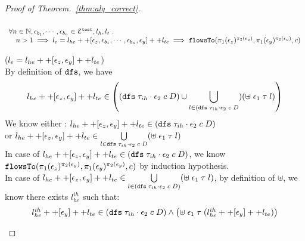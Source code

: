 \begin{proof}[Proof of Theorem.~\ref{thm:alg_correct}]
\begin{case}
\begin{equation}
  \end{equation}
%
%
\begin{equation}
\begin{array}{l}
  \forall n \in \mathbb{N}, \mathtt{\epsilon}_{b_1}, \cdots, \mathtt{\epsilon}_{b_n} \in \mathcal{E}^{\mathtt{{test}}}, l_h, l_t ~.~
   \\ \quad 
   n > 1 \implies
   l_e = l_{he} ++ {[\mathtt{\epsilon}_z, \mathtt{\epsilon}_{b_1}, \cdots, \mathtt{\epsilon}_{b_n}, \mathtt{\epsilon}_y]} ++ l_{te}
  \implies \mathtt{flowsTo}(\pi_1(\mathtt{\epsilon}_z)^{\pi_2(\mathtt{\epsilon}_y)}, \pi_1(\mathtt{\epsilon}_y)^{\pi_2(\mathtt{\epsilon}_y)}, c)
\end{array}
\end{equation}
%
\begin{subcase}($l_e = l_{he} ++ [\mathtt{\epsilon}_z, \mathtt{\epsilon}_y] ++ l_{te}$)
\\
By definition of $\mathtt{dfs}$, we have
%
\[
  l_{he} ++ [\event_z, \event_y] ++ l_{te}  \in 
  \left(  (\kw{dfs} \eapp {\trace_{ih} \cdot \event_2} \eapp c \eapp D ) \cup
  \bigcup\limits_{l \in (\kw{dfs} \eapp {\trace_{ih} \cdot \event_2} \eapp c \eapp D } )(\uplus \eapp \event_1 \eapp \trace \eapp l)
  \right)
\]
We know either :
$l_{he} ++ [\mathtt{\epsilon}_z, \mathtt{\epsilon}_y] ++ l_{te}  \in (\mathtt{dfs} \; {\mathtt{\tau}_{ih} \cdot \mathtt{\epsilon}_2} \; c \; D )$
\\
or $l_{he} ++ [\mathtt{\epsilon}_z, \mathtt{\epsilon}_y] ++ l_{te}  \in  
\bigcup\limits_{l \in \mathtt{dfs} \; {\mathtt{\tau}_{ih} \cdot \mathtt{\epsilon}_2} \; c \; D } (\uplus \; \mathtt{\epsilon}_1 \; \mathtt{\tau} \; l)$
\\
In case of $l_{he} ++ [\mathtt{\epsilon}_z, \mathtt{\epsilon}_y] ++ l_{te}  \in (\mathtt{dfs} \; {\mathtt{\tau}_{ih} \cdot \mathtt{\epsilon}_2} \; c \; D )$, we know 
$\mathtt{flowsTo}(\pi_1(\mathtt{\epsilon}_z)^{\pi_2(\mathtt{\epsilon}_y)}, \pi_1(\mathtt{\epsilon}_y)^{\pi_2(\mathtt{\epsilon}_y)}, c)$ by induction hypothesis.
\\
%
In case of $l_{he} ++ [\mathtt{\epsilon}_z, \mathtt{\epsilon}_y] ++ l_{te}  \in  
\bigcup\limits_{l \in (\mathtt{dfs} \; {\mathtt{\tau}_{ih} \cdot \mathtt{\epsilon}_2} \; c \; D) } (\uplus \; \mathtt{\epsilon}_1 \; \mathtt{\tau} \; l)$,
by definition of $\uplus$, we know there exists $l^{ih}_{he}$ such that:
\[
\begin{array}{l}
  l^{ih}_{he} ++ [\event_y] ++ l_{te} \in (\kw{dfs} \eapp {\trace_{ih} \cdot \event_2} \eapp c \eapp D )
  \land
  \left(\uplus \eapp \event_1 \eapp \trace \eapp ( l^{ih}_{he} ++ [\event_y] ++ l_{te}) \right) 

\end{array}\]
\end{subcase}
\end{case}
\end{proof}

